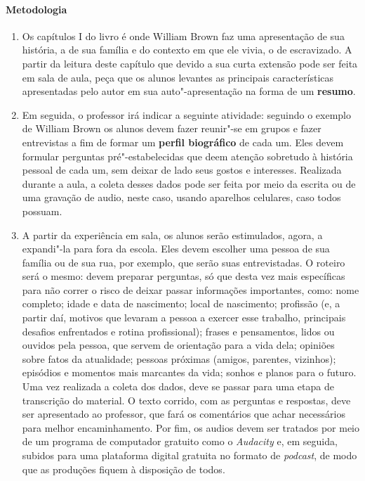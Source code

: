 \documentclass[11pt]{extarticle}
\begin{document}
 \paragraph{Metodologia}
   \begin{enumerate}
    \item
    Os capítulos I do livro é onde William Brown faz uma apresentação
    de sua história, a de sua família e do contexto em que ele vivia, o
    de escravizado. A partir da leitura deste capítulo que devido a sua curta 
    extensão pode ser feita em sala de aula, peça que os alunos levantes
    as principais características apresentadas pelo autor em sua auto"-apresentação
    na forma de um \textbf{resumo}.

    \item
    Em seguida, o professor irá indicar a seguinte atividade:
    seguindo o exemplo de William Brown os alunos devem fazer
    reunir"-se em grupos e fazer entrevistas a fim de formar um
    \textbf{perfil biográfico} de cada um. Eles devem formular 
    perguntas pré"-estabelecidas que deem atenção sobretudo à história 
    pessoal de cada um, sem deixar de lado seus gostos e interesses. 
    Realizada durante a aula, a coleta desses dados pode ser feita por 
    meio da escrita ou de uma gravação de audio, neste caso, usando
    aparelhos celulares, caso todos possuam.

    \item 
    A partir da experiência em sala, os alunos serão estimulados, agora,
    a expandi"-la para fora da escola. Eles devem escolher uma pessoa 
    de sua família ou de sua rua, por exemplo, que serão suas entrevistadas.
    O roteiro será o mesmo: devem preparar perguntas, só que desta vez mais 
    específicas para não correr o risco de deixar passar informações importantes, como:
    nome completo; idade e data de
    nascimento; local de nascimento; profissão (e, a partir daí, motivos que
    levaram a pessoa a exercer esse trabalho, principais desafios
    enfrentados e rotina profissional); frases e pensamentos, lidos ou
    ouvidos pela pessoa, que servem de orientação para a vida dela; opiniões
    sobre fatos da atualidade; pessoas próximas (amigos, parentes,
    vizinhos); episódios e momentos mais marcantes da vida; sonhos e planos
    para o futuro.
    Uma vez realizada a coleta dos dados, deve se passar para uma etapa de 
    transcrição do material. O texto corrido, com as perguntas e respostas,
    deve ser apresentado ao professor, que fará os comentários que achar necessários
    para melhor encaminhamento. 
    Por fim, os audios devem ser tratados por meio de um programa de computador
    gratuito como o \emph{Audacity} e, em seguida, subidos para uma plataforma
    digital gratuita no formato de \emph{podcast}, de modo que as produções fiquem 
    à disposição de todos.

   \end{enumerate}
\end{document}

